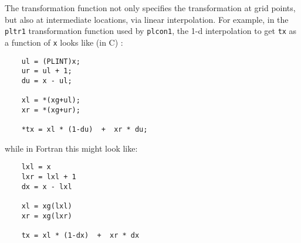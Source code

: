 The transformation function not only specifies the transformation at grid
points, but also at intermediate locations, via linear interpolation.  For
example, in the {\tt pltr1} transformation function used by {\tt plcon1}, 
the 1-d interpolation to get {\tt tx} as a function of {\tt x} 
looks like (in C) :
%
\begin{verbatim}
    ul = (PLINT)x;
    ur = ul + 1;
    du = x - ul;

    xl = *(xg+ul);
    xr = *(xg+ur);

    *tx = xl * (1-du)  +  xr * du;
\end{verbatim}
%
while in Fortran this might look like:
%
\begin{verbatim}
    lxl = x
    lxr = lxl + 1
    dx = x - lxl

    xl = xg(lxl)
    xr = xg(lxr)

    tx = xl * (1-dx)  +  xr * dx
\end{verbatim}
